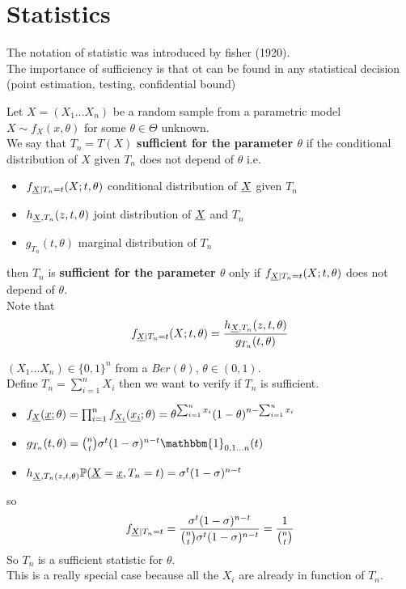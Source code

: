 \chapter{Statistics}
\vspace{15pt}



The notation of statistic was introduced by fisher (1920).\\
The importance of sufficiency is that ot can be found in any statistical decision (point estimation, testing, confidential bound)
\begin{defi}
	Let $X=(X_1... X_n)$ be a random sample from a parametric model $X\sim f_X(x,\theta)$ for some $\theta \in \Theta$ unknown.\\
	We say that $T_n=T(X)$ \textbf{sufficient for the parameter $\theta$} if the conditional distribution of $X$ given $T_n$ does not depend of $\theta$ i.e.
	\begin{itemize}
		\item $f_{\underline X|T_n=t}(X;t,\theta)$ conditional distribution of $\underline X$ given $T_n$
		\item $h_{\underline X,T_n}(z,t,\theta)$ joint distribution of $\underline X$ and $T_n$
		\item $g_{T_n}(t,\theta)$ marginal distribution of $T_n$
	\end{itemize}
then $T_n$ is \textbf{sufficient for the parameter $\theta$} only if $f_{\underline X|T_n=t}(X;t,\theta)$ does not depend of $\theta$.\\
Note that
\[
f_{\underline X|T_n=t}(X;t,\theta)=\frac{h_{\underline X,T_n}(z,t,\theta)}{g_{T_n}(t,\theta)}
\]
\end{defi}
\begin{eg} \label{eg:ber}
	$(X_1... X_n)\in \{0,1\}^n$ from a $Ber(\theta)$, $\theta \in (0,1)$.\\
	Define $T_n=\sum_{i=1}^{n}X_i$ then we want to verify if $T_n$ is sufficient.\\
	\begin{itemize}
		\item $f_{\underline X}(\underline x;\theta) = \prod_{i=1}^{n} f_{\underline{X_i}}(\underline{x_i};\theta)=\theta^{\sum_{i=1}^{n}x_i}(1-\theta)^{n-\sum_{i=1}^{n}x_i}$
		\item$g_{T_n}(t,\theta)={{n}\choose{t}}\sigma^t(1-\sigma)^{n-t}\mathbbm{1}_{0,1...n}(t)$
		\item$h_{\underline X,T_n(z,t,\theta)}\mathbb{P}(\underline X=\underline x,T_n=t)=\sigma^t(1-\sigma)^{n-t}$
	\end{itemize}
	so 
	$$f_{\underline X|T_n=t}=\frac{\sigma^t(1-\sigma)^{n-t}}{{{n}\choose{t}}\sigma^t(1-\sigma)^{n-t}}=\frac{1}{{{n}\choose{t}}}$$
	So $T_n$ is a sufficient statistic for $\theta$.\\
	This is a really special case because all the $X_i$ are already in function of $T_n$.
\end{eg}

